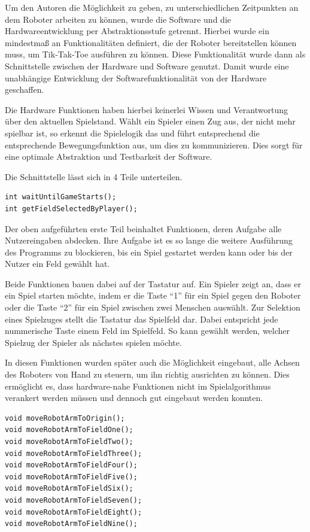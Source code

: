 \documentclass[conference,compsoc,final,a4paper]{IEEEtran}
\begin{document}
Um den Autoren die Möglichkeit zu geben, zu unterschiedlichen Zeitpunkten an dem Roboter arbeiten
zu können, wurde die Software und die Hardwareentwicklung per Abstraktionsstufe getrennt. Hierbei wurde
ein mindestmaß an Funktionalitäten definiert, die der Roboter bereitstellen können muss, um Tik-Tak-Toe
ausführen zu können. Diese Funktionalität wurde dann als Schnittstelle zwischen der Hardware und Software
genutzt. Damit wurde eine unabhängige Entwicklung der Softwarefunktionalität von der Hardware geschaffen.

Die Hardware Funktionen haben hierbei keinerlei Wissen und Verantwortung über den aktuellen Spielstand.
Wählt ein Spieler einen Zug aus, der nicht mehr spielbar ist, so erkennt die Spielelogik das und führt
entsprechend die entsprechende Bewegungsfunktion aus, um dies zu kommunizieren. Dies sorgt für eine
optimale Abstraktion und Testbarkeit der Software.

Die Schnittstelle lässt sich in 4 Teile unterteilen.

\begin{verbatim}
int waitUntilGameStarts();
int getFieldSelectedByPlayer();
\end{verbatim}

Der oben aufgeführten erste Teil beinhaltet Funktionen, deren Aufgabe alle Nutzereingaben abdecken.
Ihre Aufgabe ist es so lange die weitere Ausführung des Programms zu blockieren,
bis ein Spiel gestartet werden kann oder bis der Nutzer ein Feld gewählt hat.

Beide Funktionen bauen dabei auf der Tastatur auf. Ein Spieler zeigt an, dass er ein Spiel starten
möchte, indem er die Taste \enquote{1} für ein Spiel gegen den Roboter oder die Taste \enquote{2}
für ein Spiel zwischen zwei Menschen auswählt. Zur Selektion eines Spielzuges stellt die Tastatur
das Spielfeld dar. Dabei entspricht jede nummerische Taste einem Feld im Spielfeld. So kann
gewählt werden, welcher Spielzug der Spieler als nächstes spielen möchte.

In diesen Funktionen wurden später auch die Möglichkeit eingebaut, alle Achsen des Roboters von 
Hand zu steuern, um ihn richtig ausrichten zu können. Dies ermöglicht es, dass hardware-nahe Funktionen
nicht im Spielalgorithmus verankert werden müssen und dennoch gut eingebaut werden konnten.

\begin{verbatim}
void moveRobotArmToOrigin();
void moveRobotArmToFieldOne();
void moveRobotArmToFieldTwo();
void moveRobotArmToFieldThree();
void moveRobotArmToFieldFour();
void moveRobotArmToFieldFive();
void moveRobotArmToFieldSix();
void moveRobotArmToFieldSeven();
void moveRobotArmToFieldEight();
void moveRobotArmToFieldNine();
\end{verbatim}
\end{document}
